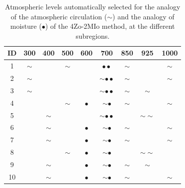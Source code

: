 \documentclass[5p]{elsarticle}
\begin{document}
\begin{table}[htb]
	\caption{Atmospheric levels automatically selected for the analogy of the atmospheric circulation ($\sim$) and the analogy of moisture ($\bullet$) of the 4Zo-2MIo method, at the different subregions.}
	\footnotesize
	\begin{center}
		\begin{tabular}{ccccccccc}
			\hline ID & 300 & 400 & 500 & 600 & 700 & 850 & 925 & 1000 \\ 
			\hline 
			1  & $\sim$ &   & $\sim$ &   & $\bullet \bullet$  & $\sim$ &   & $\sim$ \\
			2  & $\sim$ &   &   &   & $\sim \bullet \bullet$ & $\sim$ &   & $\sim$ \\
			3  & $\sim$ &   &   &   & $\sim \bullet \bullet$ & $\sim$ & $\sim$ &   \\
			4  &   &   & $\sim$ & $\bullet$ & $\sim \bullet$ & $\sim$ &   & $\sim$ \\
			5  &   & $\sim$ &   &   & $\sim \bullet \bullet$ &   & $\sim \sim$ &   \\
			6  &   & $\sim$ &   & $\bullet$ & $\sim \bullet$ & $\sim$ &   & $\sim$ \\
			7  &   & $\sim$ &   & $\bullet$ & $\sim \bullet$ & $\sim$ &   & $\sim$ \\
			8  &   &   & $\sim$ & $\bullet$ & $\sim \bullet$ &   & $\sim \sim$ &   \\
			9  &   & $\sim$ &   & $\bullet$ & $\sim \bullet$ & $\sim$ & $\sim$ &   \\
			10 &   & $\sim$ &   & $\bullet$ & $\sim \bullet$ & $\sim$ &   & $\sim$ \\
			\hline 
		\end{tabular} 
	\end{center}
	\label{table:levels_GA_4Zo_2MIo}
\end{table}
\end{document}
